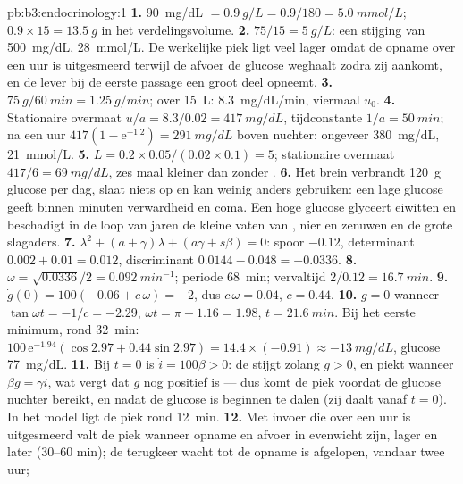 \begin{solution}{pb:b3:endocrinology:1}
\textbf{1.} \qty{90}{mg/dL} $= \qty{0.9}{g/L} = 0.9/180 = \qty{5.0}{mmol/L}$;
$0.9\times 15 = \qty{13.5}{g}$ in het verdelingsvolume.
\textbf{2.} $75/15 = \qty{5}{g/L}$: een stijging van \qty{500}{mg/dL},
\qty{28}{mmol/L}. De werkelijke piek ligt veel lager omdat de opname
over een uur is uitgesmeerd terwijl de afvoer de glucose weghaalt
zodra zij aankomt, en de lever bij de eerste passage een groot deel
opneemt.
\textbf{3.} $\qty{75}{g}/\qty{60}{min} = \qty{1.25}{g/min}$; over
\qty{15}{L}: \qty{8.3}{mg/dL/min}, viermaal $u_{0}$.
\textbf{4.} Stationaire overmaat $u/a = 8.3/0.02 = \qty{417}{mg/dL}$,
tijdconstante $1/a = \qty{50}{min}$; na een uur $417(1 -
\mathrm{e}^{-1.2}) = \qty{291}{mg/dL}$ boven nuchter: ongeveer
\qty{380}{mg/dL}, \qty{21}{mmol/L}.
\textbf{5.} $L = 0.2\times 0.05/(0.02\times 0.1) = 5$; stationaire
overmaat $417/6 = \qty{69}{mg/dL}$, zes maal kleiner dan zonder
.
\textbf{6.} Het brein verbrandt \qty{120}{g} glucose per dag, slaat
niets op en kan weinig anders gebruiken: een lage glucose geeft binnen
minuten verwardheid en coma. Een hoge glucose glyceert eiwitten en
beschadigt in de loop van jaren de kleine vaten van , nier en
zenuwen en de grote slagaders.
\textbf{7.} $\lambda^{2} + (a + \gamma)\lambda + (a\gamma + s\beta) = 0$:
spoor $-0.12$, determinant $0.002 + 0.01 = 0.012$, discriminant
$0.0144 - 0.048 = -0.0336$.
\textbf{8.} $\omega = \sqrt{0.0336}/2 = \qty{0.092}{min^{-1}}$; periode
\qty{68}{min}; vervaltijd $2/0.12 = \qty{16.7}{min}$.
\textbf{9.} $\dot g(0) = 100(-0.06 + c\,\omega) = -2$, dus $c\,\omega =
0.04$, $c = 0.44$.
\textbf{10.} $g = 0$ wanneer $\tan\omega t = -1/c = -2.29$, $\omega t =
\pi - 1.16 = 1.98$, $t = \qty{21.6}{min}$. Bij het eerste minimum, rond
\qty{32}{min}: $100\,\mathrm{e}^{-1.94}(\cos 2.97 + 0.44\sin 2.97) =
14.4\times(-0.91) \approx -\qty{13}{mg/dL}$, glucose \qty{77}{mg/dL}.
\textbf{11.} Bij $t = 0$ is $\dot i = 100\beta > 0$: de  stijgt
zolang $g > 0$, en piekt wanneer $\beta g = \gamma i$, wat vergt dat
$g$ nog positief is --- dus komt de piek voordat de glucose nuchter
bereikt, en nadat de glucose is beginnen te dalen (zij daalt vanaf
$t = 0$). In het model ligt de piek rond \qty{12}{min}.
\textbf{12.} Met invoer die over een uur is uitgesmeerd valt de piek
wanneer opname en afvoer in evenwicht zijn, lager en later (30--60
min); de terugkeer wacht tot de opname is afgelopen, vandaar twee uur;

\end{solution}
